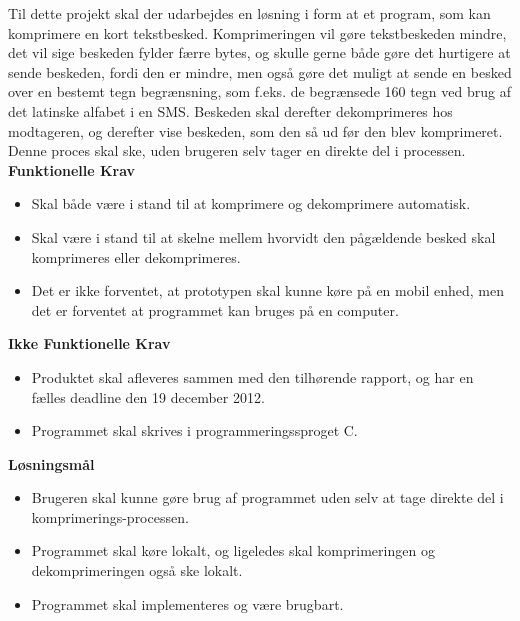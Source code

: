 Til dette projekt skal der udarbejdes en løsning i form at et program, som kan komprimere en kort tekstbesked. Komprimeringen vil gøre tekstbeskeden mindre, det vil sige beskeden fylder færre bytes, og skulle gerne både gøre det hurtigere at sende beskeden, fordi den er mindre, men også gøre det muligt at sende en besked over en bestemt tegn begrænsning, som f.eks. de begrænsede 160 tegn ved brug af det latinske alfabet i en SMS. Beskeden skal derefter dekomprimeres hos modtageren, og derefter vise beskeden, som den så ud før den blev komprimeret. Denne proces skal ske, uden brugeren selv tager en direkte del i processen.\\

\textbf{Funktionelle Krav}
\begin {itemize}
	\item Skal både være i stand til at komprimere og dekomprimere automatisk.
	\item Skal være i stand til at skelne mellem hvorvidt den pågældende besked skal komprimeres eller dekomprimeres.
	\item Det er ikke forventet, at prototypen skal kunne køre på en mobil enhed, men det er forventet at programmet kan bruges på en computer.
\end{itemize}

\textbf{Ikke Funktionelle Krav}
\begin {itemize}
	\item Produktet skal afleveres sammen med den tilhørende rapport, og har en fælles deadline den 19 december 2012.
	\item Programmet skal skrives i programmeringssproget C.
\end{itemize}

\textbf{Løsningsmål}
\begin {itemize}
	\item Brugeren skal kunne gøre brug af programmet uden selv at tage direkte del i komprimerings-processen.
	\item Programmet skal køre lokalt, og ligeledes skal komprimeringen og dekomprimeringen også ske lokalt.
	\item Programmet skal implementeres og være brugbart.
\end{itemize}
